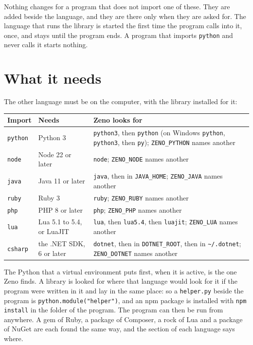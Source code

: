 \begin{note}
Nothing changes for a program that does not import one of these. They
are added beside the language, and they are there only when they are
asked for. The language that runs the library is started the first
time the program calls into it, once, and stays until the program
ends. A program that imports \verb|python| and never calls it starts
nothing.
\end{note}

\section{What it needs}

The other language must be on the computer, with the library
installed for it:

\begin{center}
\begin{tabular}{llP{6.2cm}}
\toprule
Import & Needs & Zeno looks for \\
\midrule
\verb|python| & Python 3 & \verb|python3|, then \verb|python|
  (on Windows \verb|python|, \verb|python3|, then \verb|py|);
  \verb|ZENO_PYTHON| names another \\
\verb|node| & Node 22 or later & \verb|node|; \verb|ZENO_NODE| names another \\
\verb|java| & Java 11 or later & \verb|java|, then in \verb|JAVA_HOME|;
  \verb|ZENO_JAVA| names another \\
\verb|ruby| & Ruby 3 & \verb|ruby|; \verb|ZENO_RUBY| names another \\
\verb|php| & PHP 8 or later & \verb|php|; \verb|ZENO_PHP| names another \\
\verb|lua| & Lua 5.1 to 5.4, or LuaJIT & \verb|lua|, then \verb|lua5.4|,
  then \verb|luajit|; \verb|ZENO_LUA| names another \\
\verb|csharp| & the .NET SDK, 6 or later & \verb|dotnet|, then in
  \verb|DOTNET_ROOT|, then in \verb|~/.dotnet|; \verb|ZENO_DOTNET|
  names another \\
\bottomrule
\end{tabular}
\end{center}

The Python that a virtual environment puts first, when it is active,
is the one Zeno finds. A library is looked for where that language
would look for it if the program were written in it and lay in the
same place: so a \verb|helper.py| beside the program is
\verb|python.module("helper")|, and an npm package is installed with
\verb|npm install| in the folder of the program. The program can then
be run from anywhere. A gem of Ruby, a package of Composer, a rock of
Lua and a package of NuGet are each found the same way, and the
section of each language says where.

